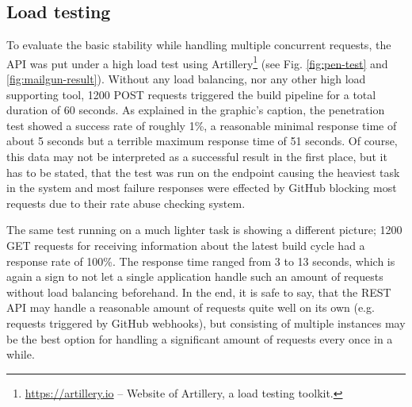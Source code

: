\subsection{Load testing}
To evaluate the basic stability while handling multiple concurrent requests, the API was put under a high load test using Artillery\footnote{\url{https://artillery.io} -- Website of Artillery, a load testing toolkit.} (see Fig. \ref{fig:pen-test} and \ref{fig:mailgun-result}). Without any load balancing, nor any other high load supporting tool, 1200 POST requests triggered the build pipeline for a total duration of 60 seconds. As explained in the graphic's caption, the penetration test showed a success rate of roughly 1\%, a reasonable minimal response time of about 5 seconds but a terrible maximum response time of 51 seconds. Of course, this data may not be interpreted as a successful result in the first place, but it has to be stated, that the test was run on the endpoint causing the heaviest task in the system and most failure responses were effected by GitHub blocking most requests due to their rate abuse checking system.

The same test running on a much lighter task is showing a different picture; 1200 GET requests for receiving information about the latest build cycle had a response rate of 100\%. The response time ranged from 3 to 13 seconds, which is again a sign to not let a single application handle such an amount of requests without load balancing beforehand. In the end, it is safe to say, that the REST API may handle a reasonable amount of requests quite well on its own (e.g. requests triggered by GitHub webhooks), but consisting of multiple instances may be the best option for handling a significant amount of requests every once in a while.
